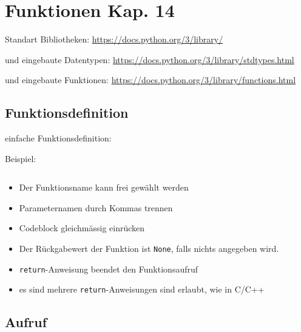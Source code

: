 \section[Funktionen]{Funktionen \tiny{Kap. 14}}

Standart Bibliotheken:  \url{https://docs.python.org/3/library/}

und eingebaute Datentypen:  \url{https://docs.python.org/3/library/stdtypes.html}

und eingebaute Funktionen:  \url{https://docs.python.org/3/library/functions.html}

\subsection{Funktionsdefinition}
einfache Funktionsdefinition:\\


\begin{minipage}[t]{0.49\textwidth}
	Beispiel:
	
	
\end{minipage}
\begin{minipage}[t]{0.02\textwidth} $ \quad $\end{minipage}
\begin{minipage}[t]{0.49\textwidth}
	\begin{itemize}
		\item Der Funktionsname kann frei gewählt werden
		\item Parameternamen durch Kommas trennen
		\item Codeblock gleichmässig einrücken
		\item Der Rückgabewert der Funktion ist \texttt{None}, falls nichts angegeben wird.
		\item \texttt{return}-Anweisung beendet den Funktionsaufruf
		\item es sind mehrere \texttt{return}-Anweisungen sind erlaubt, wie in C/C++
	\end{itemize}
\end{minipage}

\subsection{Aufruf}


